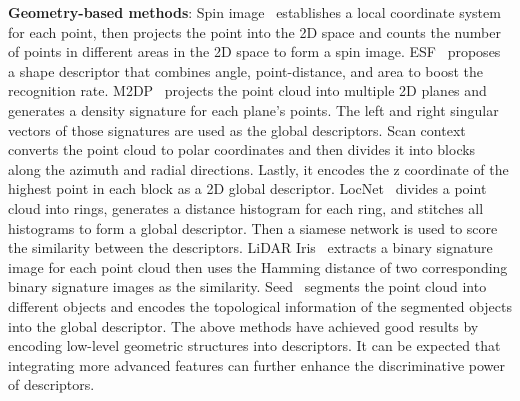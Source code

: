 \documentclass[letterpaper, 10 pt, conference]{ieeeconf}
\begin{document}
\textbf{Geometry-based methods}: Spin image~\cite{spin} establishes a local coordinate system for each point, then projects the point into the 2D space and counts the number of points in different areas in the 2D space to form a spin image. ESF~\cite{ESF} proposes a shape descriptor that combines angle, point-distance, and area to boost the recognition rate. M2DP~\cite{M2DP} projects the point cloud into multiple 2D planes and generates a density signature for each plane's points. The left and right singular vectors of those signatures are used as the global descriptors. Scan context~\cite{SC,SC1} converts the point cloud to polar coordinates and then divides it into blocks along the azimuth and radial directions. Lastly, it encodes the z coordinate of the highest point in each block as a 2D global descriptor. LocNet~\cite{locnet} divides a point cloud into rings, generates a distance histogram for each ring, and stitches all histograms to form a global descriptor. Then a siamese network is used to score the similarity between the descriptors. LiDAR Iris~\cite{LI} extracts a binary signature image for each point cloud then uses the Hamming distance of two corresponding binary signature images as the similarity. Seed~\cite{seed} segments the point cloud into different objects and encodes the topological information of the segmented objects into the global descriptor. The above methods have achieved good results by encoding low-level geometric structures into descriptors. It can be expected that integrating more advanced features can further enhance the discriminative power of descriptors.
\end{document}
